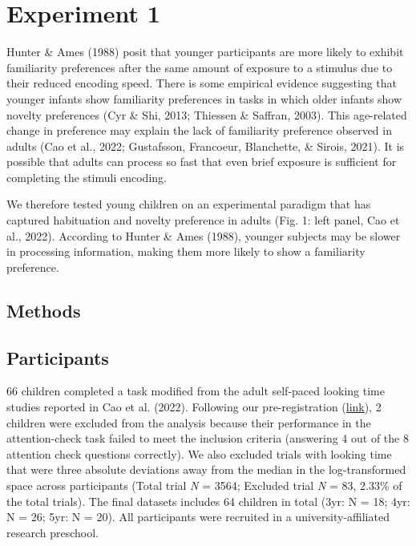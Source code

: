 \documentclass[10pt, letterpaper]{article}
\begin{document}
\hypertarget{experiment-1}{%
\section{Experiment 1}\label{experiment-1}}

Hunter \& Ames (1988) posit that younger participants are more likely to
exhibit familiarity preferences after the same amount of exposure to a
stimulus due to their reduced encoding speed. There is some empirical
evidence suggesting that younger infants show familiarity preferences in
tasks in which older infants show novelty preferences (Cyr \& Shi, 2013;
Thiessen \& Saffran, 2003). This age-related change in preference may
explain the lack of familiarity preference observed in adults (Cao et
al., 2022; Gustafsson, Francoeur, Blanchette, \& Sirois, 2021). It is
possible that adults can process so fast that even brief exposure is
sufficient for completing the stimuli encoding.

We therefore tested young children on an experimental paradigm that has
captured habituation and novelty preference in adults (Fig. 1: left
panel, Cao et al., 2022). According to Hunter \& Ames (1988), younger
subjects may be slower in processing information, making them more
likely to show a familiarity preference.

\hypertarget{methods}{%
\subsection{Methods}\label{methods}}

\hypertarget{participants}{%
\subsection{Participants}\label{participants}}

66 children completed a task modified from the adult self-paced looking
time studies reported in Cao et al. (2022). Following our
pre-registration
(\href{https://aspredicted.org/blind.php?x=5WQ_YQH}{link}), 2 children
were excluded from the analysis because their performance in the
attention-check task failed to meet the inclusion criteria (answering 4
out of the 8 attention check questions correctly). We also excluded
trials with looking time that were three absolute deviations away from
the median in the log-transformed space across participants (Total trial
\emph{N} = 3564; Excluded trial \emph{N} = 83, 2.33\% of the total
trials). The final datasets includes 64 children in total (3yr: N = 18;
4yr: N = 26; 5yr: N = 20). All participants were recruited in a
university-affiliated research preschool.
\end{document}

